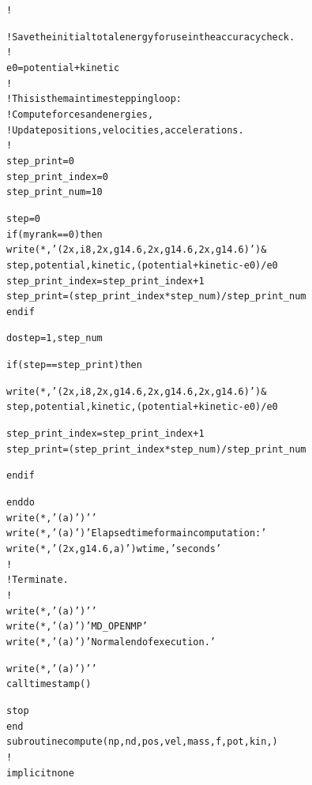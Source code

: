 \documentclass{article}
\begin{document}
{{\begin{alltt}
!

!  Save the initial total energy for use in the accuracy check.
!
  e0 = potential + kinetic
!
!  This is the main time stepping loop:
!    Compute forces and energies,
!    Update positions, velocities, accelerations.
!
  step_print = 0
  step_print_index = 0
  step_print_num = 10

  step = 0
if(myrank ==0) then
  write ( *, '(2x,i8,2x,g14.6,2x,g14.6,2x,g14.6)' ) &
    step, potential, kinetic, ( potential + kinetic - e0 ) / e0
  step_print_index = step_print_index + 1
  step_print = ( step_print_index * step_num ) / step_print_num
endif

  do step = 1, step_num

 {\color{red}{call compute ( np, nd, pos, vel, mass, loc_force, loc_potential, loc_kinetic,myrank,numprocs )
 call MPI_Allreduce(loc_force, force,nd*np , MPI_Double, MPI_SUM,  MPI_COMM_WORLD, ierr)
 call MPI_Allreduce(loc_potential, potential, 1  , MPI_Double, MPI_SUM,  MPI_COMM_WORLD, ierr)
 call MPI_Allreduce(loc_kinetic, kinetic, 1  , MPI_Double, MPI_SUM, MPI_COMM_WORLD, ierr)}}

{\color{red}{if (myrank ==0 )  then}}
  if ( step == step_print ) then

      write ( *, '(2x,i8,2x,g14.6,2x,g14.6,2x,g14.6)' ) &
        step, potential, kinetic, ( potential + kinetic - e0 ) / e0

      step_print_index = step_print_index + 1
      step_print = ( step_print_index * step_num ) / step_print_num

    end if
{\color{red}{endif}}

 {\color{red}{   call update ( np, nd,loc_pos, loc_vel, loc_acc,  pos, vel, force, acc, mass, dt, myrank, numprocs )
    call MPI_Allreduce(loc_pos,pos, nd*np , MPI_Double, MPI_SUM,  MPI_COMM_WORLD, ierr)
    call MPI_Allreduce(loc_vel,vel, nd*np , MPI_Double, MPI_SUM,  MPI_COMM_WORLD, ierr)
    call MPI_Allreduce(loc_acc,acc, nd*np , MPI_Double, MPI_SUM,  MPI_COMM_WORLD, ierr)}}


  end do
{\color{red}{if(myrank ==0 ) then
  wtime = MPI_Wtime ( ) - wtime}}
  write ( *, '(a)' ) ' '
  write ( *, '(a)' ) '  Elapsed time for main computation:'
  write ( *, '(2x,g14.6,a)' ) wtime, ' seconds'
!
!  Terminate.
!
  write ( *, '(a)' ) ' '
  write ( *, '(a)' ) 'MD_OPENMP'
  write ( *, '(a)' ) '  Normal end of execution.'

  write ( *, '(a)' ) ' '
  call timestamp ( )

 {\color{red}{endif
  call MPI_Finalize ( ierr )}}
  stop
end
subroutine compute ( np, nd, pos, vel, mass, f, pot, kin ,{\color{red}{myrank, numprocs }})
!
  implicit none


\end{alltt}}}
\end{document}
